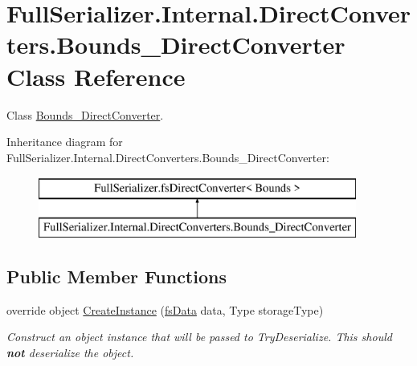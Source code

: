 \hypertarget{class_full_serializer_1_1_internal_1_1_direct_converters_1_1_bounds___direct_converter}{}\section{Full\+Serializer.\+Internal.\+Direct\+Converters.\+Bounds\+\_\+\+Direct\+Converter Class Reference}
\label{class_full_serializer_1_1_internal_1_1_direct_converters_1_1_bounds___direct_converter}


Class \hyperlink{class_full_serializer_1_1_internal_1_1_direct_converters_1_1_bounds___direct_converter}{Bounds\+\_\+\+Direct\+Converter}.  


Inheritance diagram for Full\+Serializer.\+Internal.\+Direct\+Converters.\+Bounds\+\_\+\+Direct\+Converter\+:\begin{figure}[H]
\begin{center}
\leavevmode
\includegraphics[height=2.000000cm]{class_full_serializer_1_1_internal_1_1_direct_converters_1_1_bounds___direct_converter}
\end{center}
\end{figure}
\subsection*{Public Member Functions}
\begin{DoxyCompactItemize}
\item 
override object \hyperlink{class_full_serializer_1_1_internal_1_1_direct_converters_1_1_bounds___direct_converter_a51f328e67770f34468f7218b4a4a2af6}{Create\+Instance} (\hyperlink{class_full_serializer_1_1fs_data}{fs\+Data} data, Type storage\+Type)
\begin{DoxyCompactList}\small\item\em Construct an object instance that will be passed to Try\+Deserialize. This should {\bfseries not} deserialize the object. \end{DoxyCompactList}\end{DoxyCompactItemize}
